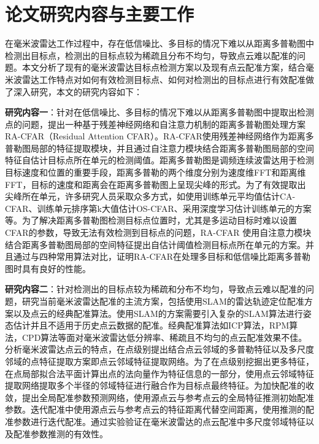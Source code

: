 \section{论文研究内容与主要工作}
在毫米波雷达工作过程中，存在低信噪比、多目标的情况下难以从距离多普勒图中检测出目标点，检测出的目标点较为稀疏且分布不均匀，导致点云难以配准的问题。本文分析了现有的毫米波雷达目标点检测方案以及现有点云配准方案，结合毫米波雷达工作特点对如何有效检测目标点、如何对检测出的目标点进行有效配准做了深入研究，本文的研究内容如下：
\par
\textbf{研究内容一}：针对在低信噪比、多目标的情况下难以从距离多普勒图中提取出检测点的问题，提出一种基于残差神经网络\cite{he2016deep}和自注意力机制\cite{vaswani2017attention}的距离多普勒图处理方案RA-CFAR（Residual Attention CFAR）。RA-CFAR使用残差神经网络作为距离多普勒图局部的特征提取模块，并且通过自注意力模块结合距离多普勒图局部的空间特征自估计目标点所在单元的检测阈值。距离多普勒图是调频连续波雷达用于检测目标速度和位置的重要手段，距离多普勒的两个维度分别为速度维FFT和距离维FFT，目标的速度和距离会在距离多普勒图上呈现尖峰的形式。为了有效提取出尖峰所在单元，许多研究人员采取众多方式，如使用训练单元平均值估计CA-CFAR、训练单元排序第k大值估计OS-CFAR、采用深度学习估计训练单元的方案等。为了解决距离多普勒图检测目标点位置时，尤其是多运动目标时难以设置CFAR的参数，导致无法有效检测到目标点的问题，RA-CFAR 使用自注意力模块结合距离多普勒图局部的空间特征提出自估计阈值检测目标点所在单元的方案。并且通过与四种常用算法对比，证明RA-CFAR在处理多目标和低信噪比距离多普勒图时具有良好的性能。
\par
\textbf{研究内容二}：针对检测出的目标点较为稀疏和分布不均匀，导致点云难以配准的问题，研究当前毫米波雷达配准的主流方案，包括使用SLAM的雷达轨迹定位配准方案\cite{grisetti2010tutorial}以及点云的经典配准算法。使用SLAM的方案需要引入复杂的SLAM算法进行姿态估计并且不适用于历史点云数据的配准。经典配准算法如ICP算法，RPM算法，CPD算法\cite{cpd}等面对毫米波雷达低分辨率、稀疏且不均匀的点云配准效果不佳。分析毫米波雷达点云的特点，在点级别提出结合点云邻域的多普勒特征以及多尺度邻域的点特征提取方案即点云邻域特征提取网络。为了在点级别挖掘出更多特征，在点局部拟合法平面计算出点的法向量作为特征信息的一部分，使用点云邻域特征提取网络提取多个半径的邻域特征进行融合作为目标点最终特征。为加快配准的收敛，提出全局配准参数预测网络，使用源点云与参考点云的全局特征推测初始配准参数。迭代配准中使用源点云与参考点云的特征距离代替空间距离，使用推测的配准参数进行迭代配准。通过实验验证在毫米波雷达的点云配准中多尺度邻域特征以及配准参数推测的有效性。

